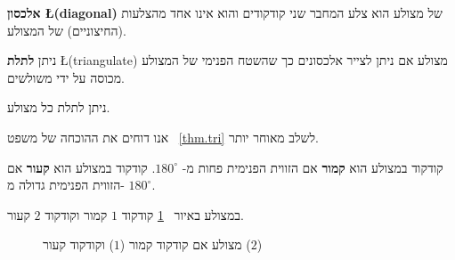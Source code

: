 \begin{definition}
\textbf{אלכסון \L{(diagonal)}}
של מצולע הוא צלע המחבר שני קודקודים והוא אינו אחד מהצלעות (החיצוניים) של המצולע.
\end{definition}
\begin{definition}
ניתן
\textbf{לתלת}
\L{(triangulate)}
מצולע אם ניתן לצייר אלכסונים כך שהשטח הפנימי של המצולע מכוסה על ידי משולשים.
\end{definition}
\begin{theorem}\label{thm.tri}
ניתן לתלת כל מצולע.
\end{theorem}
אנו דוחים את ההוכחה של משפט%
~\ref{thm.tri}
לשלב מאוחר יותר.
\begin{definition}
קודקוד במצולע הוא 
\textbf{קמור}
אם הזווית הפנימית פחות מ-%
$180^\circ$.
קודקוד במצולע הוא
\textbf{קעור}
אם הזווית הפנימית גדולה מ-%
$180^\circ$.

במצולע באיור%
~\ref{f.museum.arbitrary}
קודקוד 
$1$
קמור וקודקוד
$2$
קעור.
\end{definition}
\begin{figure}[htb]
\begin{center}
\end{center}
\caption{מצולע אם קודקוד קמור
($1$)
וקודקוד קעור
($2$)}\label{f.museum.arbitrary}
\end{figure}


